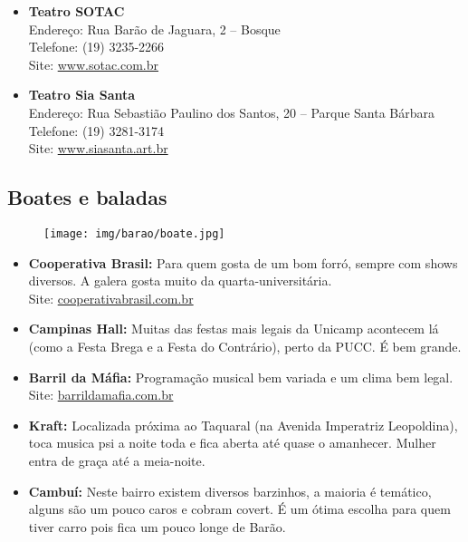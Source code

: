 \begin{itemize}
    \item   \textbf{Teatro SOTAC}
		\\Endereço: Rua Barão de Jaguara, 2 -- Bosque
		\\Telefone: (19) 3235-2266
		\\Site: \url{www.sotac.com.br}

    \item   \textbf{Teatro Sia Santa}
		\\Endereço: Rua Sebastião Paulino dos Santos, 20 -- Parque Santa Bárbara
        \\Telefone: (19) 3281-3174
		\\Site: \url{www.siasanta.art.br}
\end{itemize}

\subsection{Boates e baladas}

\begin{figure}[h!]
    \centering
    \texttt{[image: img/barao/boate.jpg]}
\end{figure}

\begin{itemize}
    \item   \textbf{Cooperativa Brasil:} Para quem gosta de um bom forró, sempre
        com shows diversos. A galera gosta muito da quarta-universitária.
        \\Site: \url{cooperativabrasil.com.br}

    \item   \textbf{Campinas Hall:} Muitas das festas mais legais da Unicamp
        acontecem lá (como a Festa Brega e a Festa do Contrário), perto da PUCC.
        É bem grande.

    \item   \textbf{Barril da Máfia:} Programação musical bem variada e um clima
        bem legal.
        \\Site: \url{barrildamafia.com.br}

    \item   \textbf{Kraft:} Localizada próxima ao Taquaral (na Avenida
        Imperatriz Leopoldina), toca musica psi a noite toda e fica aberta até
        quase o amanhecer. Mulher entra de graça até a meia-noite.

    \item   \textbf{Cambuí:} Neste bairro existem diversos barzinhos, a maioria
        é temático, alguns são um pouco caros e cobram covert. É um ótima
        escolha para quem tiver carro pois fica um pouco longe de Barão.
\end{itemize}

